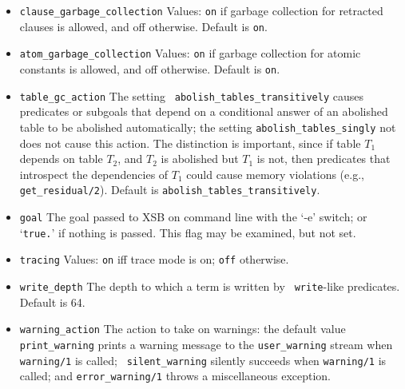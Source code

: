 \begin{description}
\begin{itemize}
%
\item {\tt clause\_garbage\_collection} Values: {\tt on} if garbage
  collection for retracted clauses is allowed, and off
  otherwise. Default is {\tt on}.
%
\item {\tt atom\_garbage\_collection} Values: {\tt on} if garbage
  collection for atomic constants is allowed, and off
  otherwise. Default is {\tt on}.

%
\item {\tt table\_gc\_action} The setting {\tt
  abolish\_tables\_transitively} causes predicates or subgoals that
  depend on a conditional answer of an abolished table to be abolished
  automatically; the setting {\tt abolish\_tables\_singly} not does
  not cause this action.  The distinction is important, since if table
  $T_1$ depends on table $T_2$, and $T_2$ is abolished but $T_1$ is
  not, then predicates that introspect the dependencies of $T_1$ could
  cause memory violations (e.g., {\tt get\_residual/2}).  Default is
  {\tt abolish\_tables\_transitively}.
%
\item {\tt goal}  The goal passed to XSB on command line with the `-e'
switch; or `{\tt true.}' if nothing is passed.  This flag may be
examined, but not set. 
%
\item {\tt tracing}  Values: {\tt on} iff trace mode is on; {\tt off}
  otherwise.
%
\item {\tt write\_depth}  The depth to which a term is written by {\tt
  write}-like predicates.  Default is 64.

\item {\tt warning\_action} The action to take on warnings: the
  default value {\tt print\_warning} prints a warning message to the
  {\tt user\_warning} stream when {\tt warning/1} is called; {\tt
    silent\_warning} silently succeeds when {\tt warning/1} is called;
  and {\tt error\_warning/1} throws a miscellaneous exception.


\end{itemize}
\end{description}
